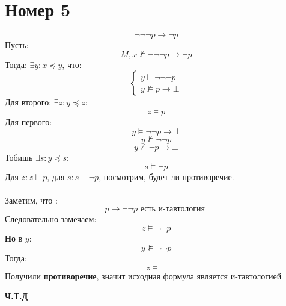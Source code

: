 \documentclass[a4paper,12pt]{article}
\begin{document}
\section*{Номер 5}
\[
\neg \neg \neg p \rightarrow \neg p
\]
Пусть:
\[
M, x \not \models \neg \neg \neg p \rightarrow \neg p
\]
Тогда:
$\exists y: x \preceq y$, что:
\[
\begin{cases}
y \models \neg \neg \neg p \\
y \not \models p \rightarrow \bot
\end{cases}
\]
Для второго: $\exists z : y \preceq z$:
\[
z \models p
\]
Для первого:
\[
y \models \neg \neg p \rightarrow \bot
\]
\[
y \not \models \neg \neg p
\]
\[
y \not \models \neg p \rightarrow \bot
\]
Тобишь $\exists s : y \preceq s$:
\[
s \models \neg p
\]
Для $z : z \models p$, для $s: s \models \neg p$, посмотрим, будет ли противоречие.
\\\\
Заметим, что :
\[
p \rightarrow \neg \neg p \text{ есть и-тавтология }
\]
Следовательно замечаем:
\[
z \models \neg \neg p
\]
\textbf{Но} в $y$:
\[
y \not \models \neg \neg p
\]
Тогда:
\[
z \models \bot
\]
Получили \textbf{противоречие}, значит исходная формула является и-тавтологией
\begin{center}
\textbf{Ч.Т.Д} 
\end{center}
\end{document}
